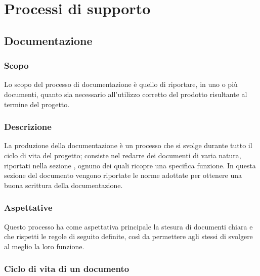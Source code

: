 \section{Processi di supporto}
\label{sec:processi_di_supporto}

\subsection{Documentazione}
\label{sub:doc}

\subsubsection{Scopo}
Lo scopo del processo di documentazione è quello di riportare, in uno o più documenti, quanto sia necessario 
all'utilizzo corretto del prodotto risultante al termine del progetto.

\subsubsection{Descrizione}
La produzione della documentazione è un processo che si svolge durante tutto il ciclo di vita del progetto; consiste 
nel redarre dei documenti di varia natura, riportati nella sezione , ognuno dei quali 
ricopre una specifica funzione. In questa sezione del documento vengono riportate le norme adottate per ottenere una 
buona scrittura della documentazione.

\subsubsection{Aspettative}
Questo processo ha come aspettativa principale la stesura di documenti chiara e che rispetti le regole di seguito 
definite, così da permettere agli stessi di svolgere al meglio la loro funzione.

\subsubsection{Ciclo di vita di un documento}
\label{ssub:ciclo_vita_doc}

